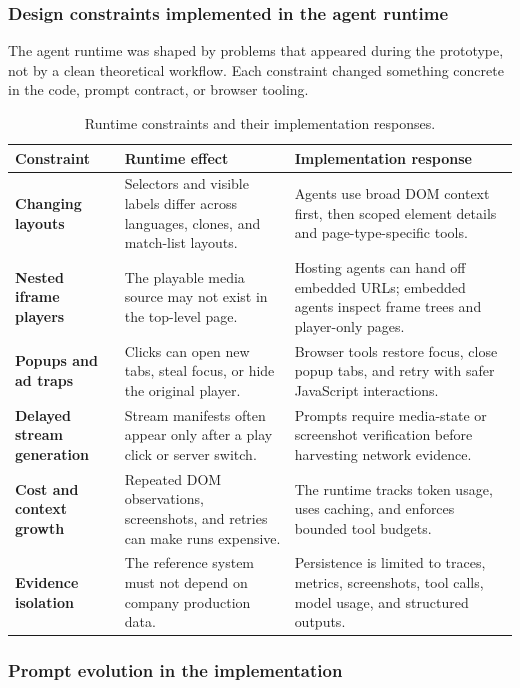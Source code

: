 \subsubsection{Design constraints implemented in the agent runtime}
The agent runtime was shaped by problems that appeared during the prototype, not by a
clean theoretical workflow. Each constraint changed something concrete in the code,
prompt contract, or browser tooling.

\begin{table}[!htbp]
\centering
\begin{tabularx}{\textwidth}{>{\raggedright\arraybackslash\bfseries}p{3.6cm}
                              >{\raggedright\arraybackslash}X
                              >{\raggedright\arraybackslash}X}
\toprule
\rowcolor{accent!8}
Constraint & Runtime effect & Implementation response \\
\midrule
Changing layouts & Selectors and visible labels differ across languages, clones, and
match-list layouts. & Agents use broad DOM context first, then scoped element details
and page-type-specific tools. \\
Nested iframe players & The playable media source may not exist in the top-level page.
& Hosting agents can hand off embedded URLs; embedded agents inspect frame trees and
player-only pages. \\
Popups and ad traps & Clicks can open new tabs, steal focus, or hide the original
player. & Browser tools restore focus, close popup tabs, and retry with safer
JavaScript interactions. \\
Delayed stream generation & Stream manifests often appear only after a play click or
server switch. & Prompts require media-state or screenshot verification before
harvesting network evidence. \\
Cost and context growth & Repeated DOM observations, screenshots, and retries can make
runs expensive. & The runtime tracks token usage, uses caching, and enforces bounded
tool budgets. \\
Evidence isolation & The reference system must not depend on company production data.
& Persistence is limited to traces, metrics, screenshots, tool calls, model usage, and
structured outputs. \\
\bottomrule
\end{tabularx}
\caption{Runtime constraints and their implementation responses.}\label{tab:agent-runtime-constraints}
\end{table}

\subsubsection{Prompt evolution in the implementation}


